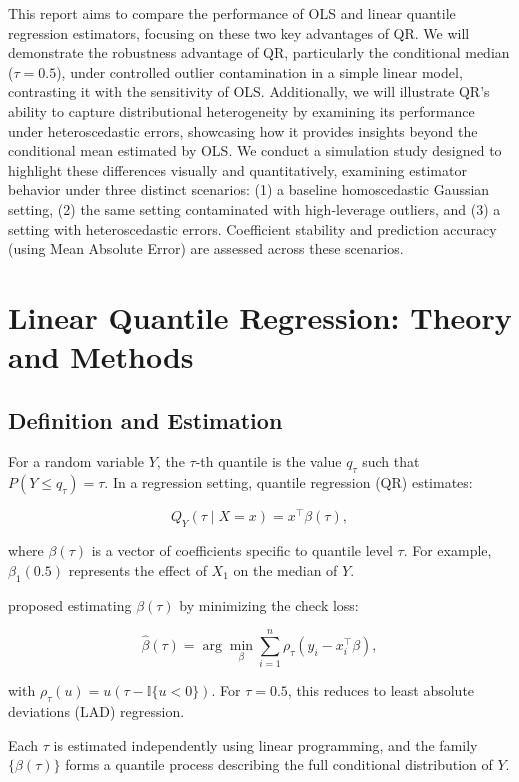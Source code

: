 \documentclass[fleqn,10pt]{latex/stylish_article} %
\begin{document}
This report aims to compare the performance of OLS and linear quantile regression estimators, focusing on these two key advantages of QR. We will demonstrate the robustness advantage of QR, particularly the conditional median (\(\tau=0.5\)), under controlled outlier contamination in a simple linear model, contrasting it with the sensitivity of OLS. Additionally, we will illustrate QR's ability to capture distributional heterogeneity by examining its performance under heteroscedastic errors, showcasing how it provides insights beyond the conditional mean estimated by OLS. We conduct a simulation study designed to highlight these differences visually and quantitatively, examining estimator behavior under three distinct scenarios: (1) a baseline homoscedastic Gaussian setting, (2) the same setting contaminated with high-leverage outliers, and (3) a setting with heteroscedastic errors. Coefficient stability and prediction accuracy (using Mean Absolute Error) are assessed across these scenarios.

\section{Linear Quantile Regression: Theory and Methods}\label{linear-quantile-regression-theory-and-methods}

\subsection{Definition and Estimation}\label{definition-and-estimation}

For a random variable \(Y\), the \(\tau\)-th quantile is the value \(q_\tau\) such that \(P(Y \le q_\tau) = \tau\). In a regression setting, quantile regression (QR) estimates:

\[
Q_Y(\tau \mid X = x) = x^\top \beta(\tau),
\]

where \(\beta(\tau)\) is a vector of coefficients specific to quantile level \(\tau\). For example, \(\beta_1(0.5)\) represents the effect of \(X_1\) on the median of \(Y\).

\citet{Koenker1978} proposed estimating \(\beta(\tau)\) by minimizing the check loss:

\[
\hat\beta(\tau) = \arg\min_\beta \sum_{i=1}^n \rho_\tau(y_i - x_i^\top \beta),
\]

with \(\rho_\tau(u) = u(\tau - \mathbb{I}\{u < 0\})\). For \(\tau = 0.5\), this reduces to least absolute deviations (LAD) regression.

Each \(\tau\) is estimated independently using linear programming, and the family \(\{\beta(\tau)\}\) forms a quantile process describing the full conditional distribution of \(Y\).
\end{document}
